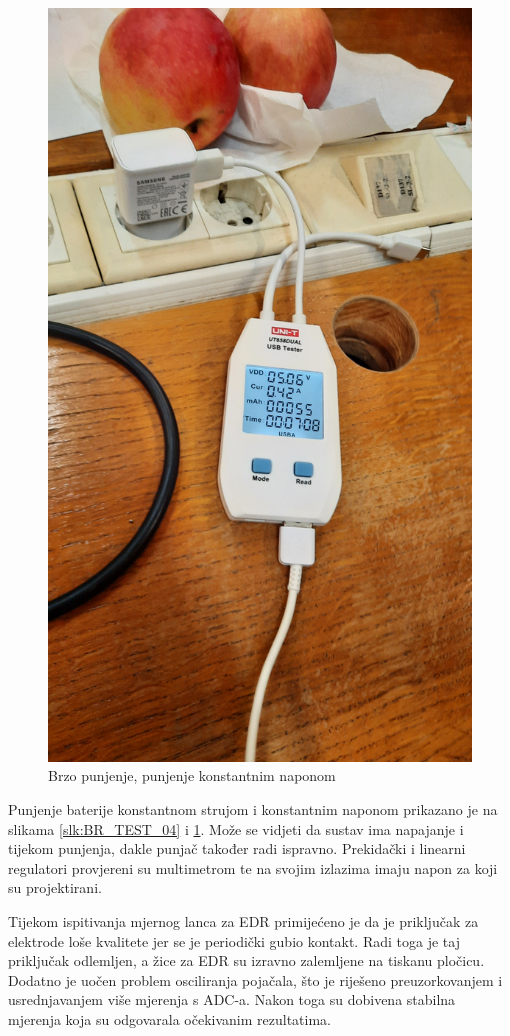 \begin{figure}[htb]
    \centering
    \includegraphics[width=10 cm]{Figures/BR_TEST_03.jpg}
    \caption{Brzo punjenje, punjenje konstantnim naponom}
    \label{slk:BR_TEST_03}
\end{figure}
Punjenje baterije konstantnom strujom i konstantnim naponom prikazano je na slikama \ref{slk:BR_TEST_04} i \ref{slk:BR_TEST_03}. Može se vidjeti da sustav ima napajanje i tijekom punjenja, dakle punjač također radi ispravno. Prekidački i linearni regulatori provjereni su multimetrom te na svojim izlazima imaju napon za koji su projektirani.

Tijekom ispitivanja mjernog lanca za EDR primijećeno je da je priključak za elektrode loše kvalitete jer se je periodički gubio kontakt. Radi toga je taj priključak odlemljen, a žice za EDR su izravno zalemljene na tiskanu pločicu. Dodatno je uočen problem osciliranja pojačala, što je riješeno preuzorkovanjem i usrednjavanjem više mjerenja s ADC-a. Nakon toga su dobivena stabilna mjerenja koja su odgovarala očekivanim rezultatima.

